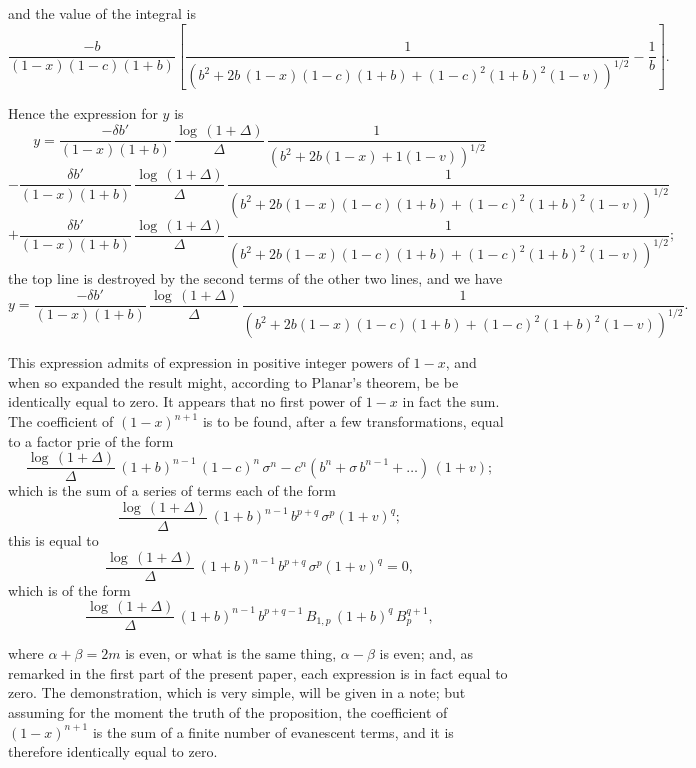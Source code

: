 \documentclass[11pt,a4paper]{article}
\begin{document}
\setcounter{page}{104}

and the value of the integral is
\[
\frac{-b}{(1-x)(1-c)(1+b)}\left[\frac{1}{(b^2 + 2b\,(1-x)(1-c)(1+b)+(1-c)^2(1+b)^2(1-v))^{1/2}} - \frac{1}{b}\right].
\]

Hence the expression for $y$ is
\[
y = \frac{-\delta b'}{(1-x)(1+b)}\,\frac{\log\,(1+\Delta)}{\Delta}\,\frac{1}{(b^2+2b(1-x)+1(1-v))^{1/2}}
\]
\[
-\frac{\delta b'}{(1-x)(1+b)}\,\frac{\log\,(1+\Delta)}{\Delta}\,\frac{1}{(b^2+2b(1-x)(1-c)(1+b)+(1-c)^2(1+b)^2(1-v))^{1/2}}
\]
\[
+\frac{\delta b'}{(1-x)(1+b)}\,\frac{\log\,(1+\Delta)}{\Delta}\,\frac{1}{(b^2+2b(1-x)(1-c)(1+b)+(1-c)^2(1+b)^2(1-v))^{1/2}};
\]
the top line is destroyed by the second terms of the other two lines, and we have
\[
y = \frac{-\delta b'}{(1-x)(1+b)}\,\frac{\log\,(1+\Delta)}{\Delta}\,\frac{1}{(b^2+2b(1-x)(1-c)(1+b)+(1-c)^2(1+b)^2(1-v))^{1/2}}.
\]

This expression admits of expression in positive integer powers of $1-x$, and when so expanded the result might, according to Planar's theorem, be be identically equal to zero. It appears that no first power of $1-x$ in fact the sum. The coefficient of $(1-x)^{n+1}$ is to be found, after a few transformations, equal to a factor prie of the form
\[
\frac{\log\,(1+\Delta)}{\Delta}\,(1+b)^{n-1}\,(1-c)^{n}\,\sigma^{n}-c^{n}(b^{n}+\sigma\,b^{n-1}+\ldots)\,(1+v);
\]
which is the sum of a series of terms each of the form
\[
\frac{\log\,(1+\Delta)}{\Delta}\,(1+b)^{n-1}\,b^{p+q}\,\sigma^{p}(1+v)^{q};
\]
this is equal to
\[
\frac{\log\,(1+\Delta)}{\Delta}\,(1+b)^{n-1}\,b^{p+q}\,\sigma^{p}(1+v)^{q} = 0,
\]
which is of the form
\[
\frac{\log\,(1+\Delta)}{\Delta}\,(1+b)^{n-1}\,b^{p+q-1}\,B_{1,p}\,(1+b)^{q}\,B_{p}^{q+1},
\]

\setcounter{page}{105}

where $\alpha+\beta = 2m$ is even, or what is the same thing, $\alpha - \beta$ is even; and, as remarked in the first part of the present paper, each expression is in fact equal to zero. The demonstration, which is very simple, will be given in a note; but assuming for the moment the truth of the proposition, the coefficient of $(1-x)^{n+1}$ is the sum of a finite number of evanescent terms, and it is therefore identically equal to zero.
\end{document}
